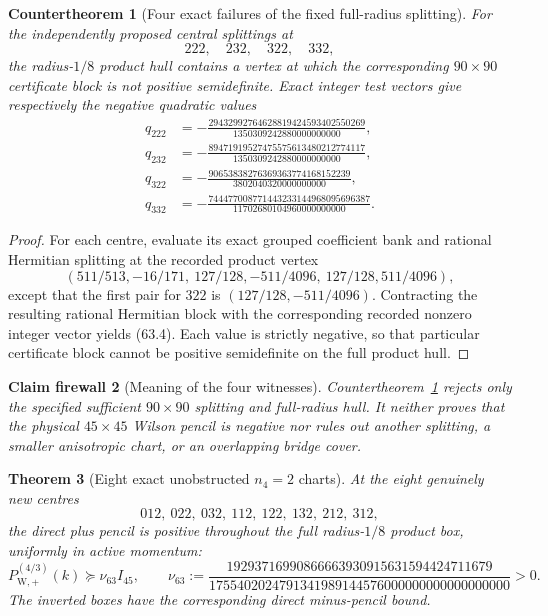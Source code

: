\documentclass[11pt,oneside]{article}
\newtheorem{theorem}{Theorem}[section]
\newtheorem{firewall}[theorem]{Claim firewall}
\newtheorem{countertheorem}[theorem]{Countertheorem}
\theoremstyle{definition}
\theoremstyle{remark}
\begin{document}
\begin{countertheorem}[Four exact failures of the fixed full-radius splitting]
\label{ctr:newv63-four-failures}
For the independently proposed central splittings at
\[
 222,\quad232,\quad322,\quad332,                      \tag{63.3}
\]
the radius-\(1/8\) product hull contains a vertex at which the
corresponding \(90\times90\) certificate block is not positive
semidefinite.  Exact integer test vectors give respectively the
negative quadratic values
\[
\begin{aligned}
q_{222}&=-\frac{29432992764628819424593402550269}
 {1350309242880000000000},\\
q_{232}&=-\frac{89471919527475575613480212774117}
 {1350309242880000000000},\\
q_{322}&=-\frac{90653838276369363774168152239}
 {3802040320000000000},\\
q_{332}&=-\frac{744477008771443233144968095696387}
 {11702680104960000000000}.
\end{aligned}                                         \tag{63.4}
\]
\end{countertheorem}

\begin{proof}
For each centre, evaluate its exact grouped coefficient bank and
rational Hermitian splitting at the recorded product vertex
\[
 (511/513,-16/171,\ 127/128,-511/4096,\
   127/128,511/4096),                                 \tag{63.5}
\]
except that the first pair for \(322\) is
\((127/128,-511/4096)\).  Contracting the resulting rational
Hermitian block with the corresponding recorded nonzero integer
vector yields (63.4).  Each value is strictly negative, so that
particular certificate block cannot be positive semidefinite on
the full product hull.
\end{proof}

\begin{firewall}[Meaning of the four witnesses]
\label{fire:newv63-witness-meaning}
Countertheorem~\ref{ctr:newv63-four-failures} rejects only the
specified sufficient \(90\times90\) splitting and full-radius hull.
It neither proves that the physical \(45\times45\) Wilson pencil is
negative nor rules out another splitting, a smaller anisotropic
chart, or an overlapping bridge cover.
\end{firewall}

\begin{theorem}[Eight exact unobstructed \(n_4=2\) charts]
\label{thm:newv63-eight-charts}
At the eight genuinely new centres
\[
 012,\ 022,\ 032,\ 112,\ 122,\ 132,\ 212,\ 312,       \tag{63.6}
\]
the direct plus pencil is positive throughout the full
radius-\(1/8\) product box, uniformly in active momentum:
\[
 P_{\mathrm W,+}^{(4/3)}(k)
 \succeq\nu_{63}I_{45},\qquad
 \nu_{63}:=
 \frac{19293716990866663930915631594424711679}
 {1755402024791341989144576000000000000000000}>0.     \tag{63.7}
\]
The inverted boxes have the corresponding direct minus-pencil
bound.
\end{theorem}
\end{document}
